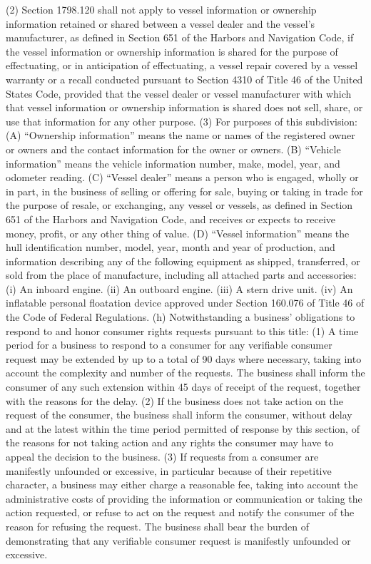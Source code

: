 (2) Section 1798.120 shall not apply to vessel information or ownership information retained or shared between a vessel dealer and the vessel’s manufacturer, as defined in Section 651 of the Harbors and Navigation Code, if the vessel information or ownership information is shared for the purpose of effectuating, or in anticipation of effectuating, a vessel repair covered by a vessel warranty or a recall conducted pursuant to Section 4310 of Title 46 of the United States Code, provided that the vessel dealer or vessel manufacturer with which that vessel information or ownership information is shared does not sell, share, or use that information for any other purpose.
(3) For purposes of this subdivision:
(A) “Ownership information” means the name or names of the registered owner or owners and the contact information for the owner or owners.
(B) “Vehicle information” means the vehicle information number, make, model, year, and odometer reading.
(C) “Vessel dealer” means a person who is engaged, wholly or in part, in the business of selling or offering for sale, buying or taking in trade for the purpose of resale, or exchanging, any vessel or vessels, as defined in Section 651 of the Harbors and Navigation Code, and receives or expects to receive money, profit, or any other thing of value.
(D) “Vessel information” means the hull identification number, model, year, month and year of production, and information describing any of the following equipment as shipped, transferred, or sold from the place of manufacture, including all attached parts and accessories:
(i) An inboard engine.
(ii) An outboard engine.
(iii) A stern drive unit.
(iv) An inflatable personal floatation device approved under Section 160.076 of Title 46 of the Code of Federal Regulations.
(h) Notwithstanding a business’ obligations to respond to and honor consumer rights requests pursuant to this title:
(1) A time period for a business to respond to a consumer for any verifiable consumer request may be extended by up to a total of 90 days where necessary, taking into account the complexity and number of the requests. The business shall inform the consumer of any such extension within 45 days of receipt of the request, together with the reasons for the delay.
(2) If the business does not take action on the request of the consumer, the business shall inform the consumer, without delay and at the latest within the time period permitted of response by this section, of the reasons for not taking action and any rights the consumer may have to appeal the decision to the business.
(3) If requests from a consumer are manifestly unfounded or excessive, in particular because of their repetitive character, a business may either charge a reasonable fee, taking into account the administrative costs of providing the information or communication or taking the action requested, or refuse to act on the request and notify the consumer of the reason for refusing the request. The business shall bear the burden of demonstrating that any verifiable consumer request is manifestly unfounded or excessive.
